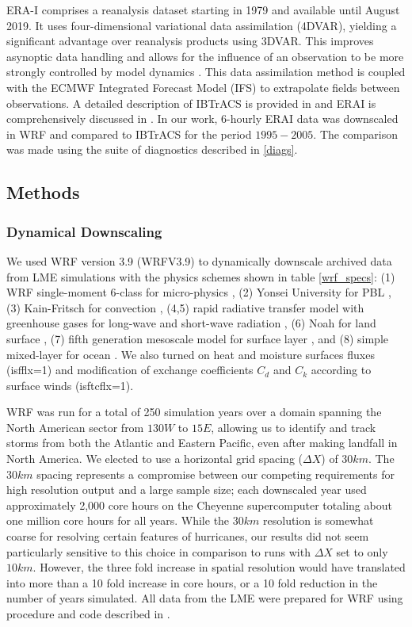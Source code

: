 \documentclass[phd,tocprelim]{cornell}
\begin{document}
ERA-I comprises a reanalysis dataset starting in 1979 and available
until August 2019. It uses four-dimensional variational data
assimilation (4DVAR), yielding a significant advantage over reanalysis
products using 3DVAR. This improves asynoptic data handling and allows
for the influence of an observation to be more strongly controlled by
model dynamics \cite{tc_reanal:2}. This data assimilation method is
coupled with the ECMWF Integrated Forecast Model (IFS) to extrapolate
fields between observations. A detailed description of IBTrACS is
provided in \cite{ibtracs} and ERAI is comprehensively discussed in
\cite{erai_reanal}. In our work, $6$-hourly ERAI data was downscaled
in WRF and compared to IBTrACS for the period $1995-2005$. The
comparison was made using the suite of diagnostics described in
\ref{diags}.

\subsection{Methods}
\subsubsection{Dynamical Downscaling}
\label{WRF}
We used WRF version 3.9 (WRFV3.9) \cite{wrf_tech} to dynamically
downscale archived data from LME simulations with the physics schemes
shown in table \ref{wrf_specs}: (1) WRF single-moment 6-class for
micro-physics \cite{mp_phys}, (2) Yonsei University for PBL
\cite{pbl_phys}, (3) Kain-Fritsch for convection \cite{cu_phys}, (4,5)
rapid radiative transfer model with greenhouse gases for long-wave and
short-wave radiation \cite{rad_phys}, (6) Noah for land surface
\cite{sfc_phys}, (7) fifth generation mesoscale model for surface
layer \cite{sfclay_phys:1,sfclay_phys:2,sfclay_phys:3}, and
(8) simple mixed-layer for ocean \cite{ocn_phys}. We also turned on
heat and moisture surfaces fluxes (isfflx=1) and modification of
exchange coefficients $C_d$ and $C_k$ according to surface winds
(isftcflx=1).

WRF was run for a total of 250 simulation years over a domain spanning
the North American sector from $130W$ to $15E$, allowing us to
identify and track storms from both the Atlantic and Eastern Pacific,
even after making landfall in North America. We elected to use a
horizontal grid spacing ($\Delta X$) of $30km$. The $30km$ spacing
represents a compromise between our competing requirements for high
resolution output and a large sample size; each downscaled year used
approximately 2,000 core hours on the Cheyenne supercomputer totaling
about one million core hours for all years. While the $30km$
resolution is somewhat coarse for resolving certain features of
hurricanes, our results did not seem particularly sensitive to this
choice in comparison to runs with $\Delta X$ set to only $10km$. However, the
three fold increase in spatial resolution would have translated into
more than a 10 fold increase in core hours, or a 10 fold reduction in
the number of years simulated. All data from the LME were prepared for WRF using procedure and code described in \cite{tech_notes}.
\end{document}
